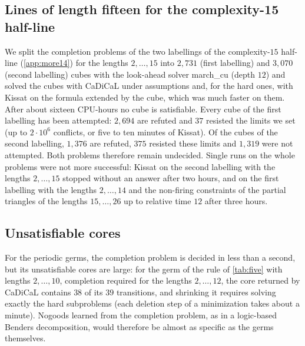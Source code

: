 \subsection{Lines of length fifteen for the complexity-15 half-line}\label{app:cube}

We split the completion problems of the two labellings of the
complexity-$15$ half-line (\cref{app:more14}) for the lengths
$2,\dots,15$ into $2{,}731$ (first labelling) and $3{,}070$ (second
labelling) cubes with the look-ahead solver
\textsf{march\_cu} (depth $12$) \cite{HeuleEtAl11} and solved the cubes
with CaDiCaL under assumptions and, for the hard ones, with Kissat on the
formula extended by the cube, which was much faster on them. After about
sixteen CPU-hours no cube is satisfiable. Every cube of the first
labelling has been attempted: $2{,}694$ are refuted and $37$ resisted the
limits we set (up to $2\cdot10^{6}$ conflicts, or five to ten minutes of
Kissat). Of the cubes of the second labelling, $1{,}376$ are refuted, $375$
resisted these limits and $1{,}319$ were not attempted. Both problems
therefore remain undecided. Single runs on the
whole problems were not more successful: Kissat on the second labelling
with the lengths $2,\dots,15$ stopped without an answer after two hours,
and on the first labelling with the lengths $2,\dots,14$ and the
non-firing constraints of the partial triangles of the lengths
$15,\dots,26$ up to relative time $12$ after three hours.

\subsection{Unsatisfiable cores}\label{app:cores}

For the periodic germs, the completion problem is decided in less than a
second, but its unsatisfiable cores are large: for the germ of the rule of
\cref{tab:five} with lengths $2,\dots,10$, completion required for the
lengths $2,\dots,12$, the core returned by CaDiCaL contains $38$ of its $39$
transitions, and shrinking it requires solving exactly the hard subproblems
(each deletion step of a minimization takes about a minute). Nogoods learned
from the completion problem, as in a logic-based Benders decomposition,
would therefore be almost as specific as the germs themselves.

